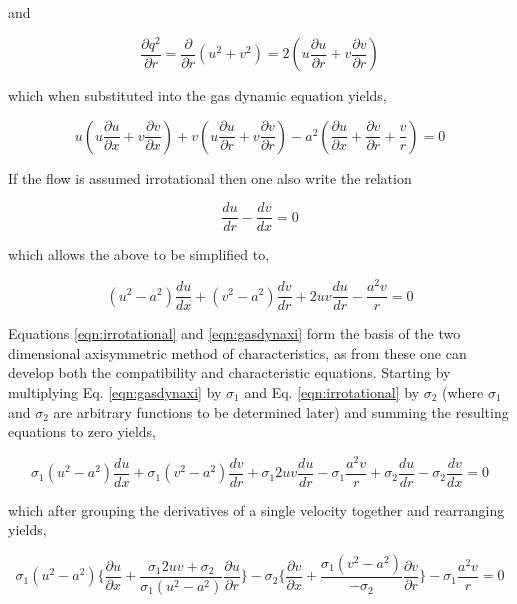 	and

\begin{displaymath}
	\frac{\partial q^2}{\partial r} = \frac{\partial}{\partial r}(u^2 + v^2) = 
	2(u\frac{\partial u}{\partial r} + v\frac{\partial v}{\partial r})
\end{displaymath}

	which when substituted into the gas dynamic equation yields,

\begin{displaymath}
	u(u\frac{\partial u}{\partial x} + v\frac{\partial v}{\partial x}) + 
	v(u\frac{\partial u}{\partial r} + v\frac{\partial v}{\partial r}) 
	- a^2(\frac{\partial u}{\partial x} + \frac{\partial v}
	{\partial r} + \frac{v}{r}) = 0 	
\end{displaymath}

	If the flow is assumed irrotational then one also write the relation

\begin{equation}
	\frac{du}{dr} - \frac{dv}{dx} = 0
\label{eqn:irrotational}
\end{equation}

	which allows the above to be simplified to,

\begin{equation}
	(u^2-a^2)\frac{du}{dx} + (v^2-a^2)\frac{dv}{dr} + 2uv\frac{du}{dr} 
	- \frac{a^2v}{r} = 0
\label{eqn:gasdynaxi}
\end{equation}

	Equations \ref{eqn:irrotational} and \ref{eqn:gasdynaxi} form the basis of the two dimensional axisymmetric
method of characteristics,
as from these one can develop both the compatibility and characteristic equations.  Starting
by multiplying Eq. \ref{eqn:gasdynaxi} by $\sigma_1$ and Eq. \ref{eqn:irrotational} by
$\sigma_2$ (where $\sigma_1$ and $\sigma_2$ are arbitrary functions to be determined later)
and summing the resulting equations to zero yields,

\begin{displaymath}	
	\sigma_1(u^2-a^2)\frac{du}{dx} + \sigma_1(v^2-a^2)\frac{dv}{dr} + \sigma_1 2uv\frac{du}{dr} 
	- \sigma_1\frac{a^2v}{r} + \sigma_2\frac{du}{dr} - \sigma_2\frac{dv}{dx} = 0
\end{displaymath}

	which after grouping the derivatives of a single velocity together and rearranging yields,

\begin{equation}
	\sigma_1(u^2-a^2)\Big\{\frac{\partial u}{\partial x} + \frac{\sigma_1 2uv + \sigma_2}
	{\sigma_1(u^2-a^2)}\frac{\partial u}{\partial r}\Big\} - \sigma_2\Big\{\frac{\partial v}
	{\partial x} + \frac{\sigma_1(v^2-a^2)}{-\sigma_2}\frac{\partial v}{\partial r}\Big\}
	- \sigma_1\frac{a^2v}{r} = 0
\label{eqn:big}
\end{equation}

